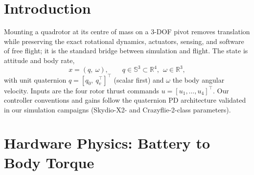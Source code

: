 \documentclass[conference]{IEEEtran}
\begin{document}
\section{Introduction}
Mounting a quadrotor at its centre of mass on a 3-DOF pivot removes translation while preserving the exact rotational dynamics, actuators, sensing, and software of free flight; it is the standard bridge between simulation and flight. The state is attitude and body rate,
\begin{equation}
x = (q,\ \omega),\qquad q\in\mathbb S^3\subset\mathbb R^4,\ \ \omega\in\mathbb R^3,
\end{equation}
with unit quaternion $q = [q_0,\ q_v^{\!\top}]^{\!\top}$ (scalar first) and $\omega$ the body angular velocity. Inputs are the four rotor thrust commands $u = [u_1,\dots,u_4]^{\!\top}$. Our controller conventions and gains follow the quaternion PD architecture validated in our simulation campaigns (Skydio-X2- and Crazyflie-2-class parameters).

\section{Hardware Physics: Battery to Body Torque}
\end{document}
